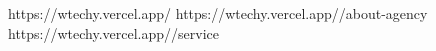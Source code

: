 https://wtechy.vercel.app/
https://wtechy.vercel.app//about-agency
https://wtechy.vercel.app//service